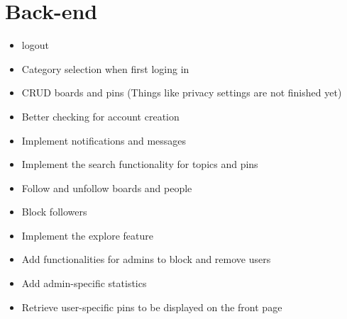 \documentclass{article}
\begin{document}
\section{Back-end}
\begin{itemize}
\item logout
\item Category selection when first loging in
\item CRUD boards and pins  (Things like privacy settings are not finished yet)
\item Better checking for account creation
\item Implement notifications and messages
\item Implement the search functionality for topics and pins
\item Follow and unfollow boards and people
\item Block followers
\item Implement the explore feature
\item Add functionalities for admins to block and remove users
\item Add admin-specific statistics
\item Retrieve user-specific pins to be displayed on the front page
\end{itemize}
\end{document}
